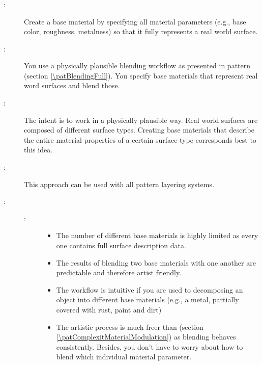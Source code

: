 \subsubsection{\patComplexityFulMaterial}\label{\patComplexityFulMaterial}
\begin{description}
	\item[\patIntent:]%
	Create a base material by specifying all material parameters (e.g., base color, roughness, metalness) so that it fully represents a real world surface.
	\item[\patMotivation:]%
	You use a physically plausible blending workflow as presented in pattern \emph{\patBlendingFull} (section \ref{\patBlendingFull}). You specify base materials that represent real word surfaces and blend those. 
	\item[\patApplicability:]%
	The intent is to work in a physically plausible way. Real world surfaces are composed of different surface types. Creating base materials that describe the entire material properties of a certain surface type corresponds best to this idea.
	\item[\patImplementation:]%
	This approach can be used with all pattern layering systems. 
	\item[\patConsequences:] 
	\begin{description}
		\item[\visual:]\hfill
		\begin{itemize}
			\item The number of different base materials is highly limited as every one contains full surface description data. 
			\item The results of blending two base materials with one another are predictable and therefore artist friendly. 
			\item The workflow is intuitive if you are used to decomposing an object into different base materials (e.g., a metal, partially covered with rust, paint and dirt)
			\item The artistic process is much freer than \emph{\patComplexitMaterialModulation} (section \ref{\patComplexitMaterialModulation}) as blending behaves consistently. Besides, you don't have to worry about how to blend which individual material parameter. 

\end{itemize}
\end{description}
\end{description}
